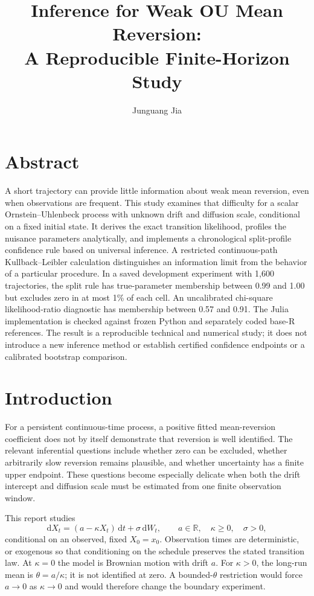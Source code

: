 \documentclass[11pt]{article}
\title{Inference for Weak OU Mean Reversion:\\
A Reproducible Finite-Horizon Study}
\author{Junguang Jia}
\date{}
\newcommand{\R}{\mathbb R}
\newcommand{\D}{\mathrm d}
\begin{document}
\maketitle

\section*{Abstract}
A short trajectory can provide little information about weak mean reversion,
even when observations are frequent. This study examines that difficulty for a
scalar Ornstein--Uhlenbeck process with unknown drift and diffusion scale,
conditional on a fixed initial state. It derives the exact transition likelihood,
profiles the nuisance parameters analytically, and implements a chronological
split-profile confidence rule based on universal inference. A restricted
continuous-path Kullback--Leibler calculation distinguishes an information limit
from the behavior of a particular procedure. In a saved development experiment
with 1,600 trajectories, the split rule has true-parameter membership between
0.99 and 1.00 but excludes zero in at most 1\% of each cell. An uncalibrated
chi-square likelihood-ratio diagnostic has membership between 0.57 and 0.91.
The Julia implementation is checked against frozen Python and separately coded
base-R references. The result is a reproducible technical and numerical study;
it does not introduce a new inference method or establish certified confidence
endpoints or a calibrated bootstrap comparison.

\section{Introduction}
For a persistent continuous-time process, a positive fitted mean-reversion
coefficient does not by itself demonstrate that reversion is well identified.
The relevant inferential questions include whether zero can be excluded,
whether arbitrarily slow reversion remains plausible, and whether uncertainty
has a finite upper endpoint. These questions become especially delicate when
both the drift intercept and diffusion scale must be estimated from one finite
observation window.

This report studies
\begin{equation}
 \D X_t=(a-\kappa X_t)\,\D t+\sigma\,\D W_t,
 \qquad a\in\R,\quad\kappa\geq0,\quad\sigma>0,
 \label{eq:model}
\end{equation}
conditional on an observed, fixed $X_0=x_0$. Observation times are deterministic,
or exogenous so that conditioning on the schedule preserves the stated
transition law. At $\kappa=0$ the model is Brownian motion with drift $a$.
For $\kappa>0$, the long-run mean is $\theta=a/\kappa$; it is not identified
at zero. A bounded-$\theta$ restriction would force $a\to0$ as $\kappa\to0$
and would therefore change the boundary experiment.
\end{document}
